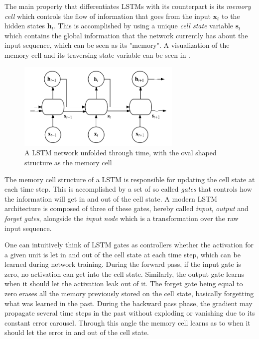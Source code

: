 \documentclass{kththesis}
\begin{document}
The main property that differentiates LSTMs with its counterpart is its \emph{memory cell} which controls the flow of information that goes from the input $\mathbf{x}_t$ to the hidden states $\mathbf{h}_t$. This is accomplished by using a unique \emph{cell state} variable $\mathbf{s}_t$ which contains the global information that the network currently has about the input sequence, which can be seen as its "memory". A visualization of the memory cell and its traversing state variable can be seen in .

\begin{figure}[h]
    \centering
    \includegraphics[width=0.7\textwidth,keepaspectratio]{figures/lstm.pdf}
    \caption{A LSTM network unfolded through time, with the oval shaped structure as the memory cell}
    \label{fig:lstm}
\end{figure}

The memory cell structure of a LSTM is responsible for updating the cell state at each time step. This is accomplished by a set of so called \emph{gates} that controls how the information will get in and out of the cell state. A modern LSTM architecture is composed of three of these gates, hereby called \emph{input}, \emph{output} and \emph{forget gates}, alongside the \emph{input node} which is a transformation over the raw input sequence. 

One can intuitively think of LSTM gates as controllers whether the activation for a given unit is let in and out of the cell state at each time step, which can be learned during network training. During the forward pass, if the input gate is zero, no activation can get into the cell state. Similarly, the output gate learns when it should let the activation leak out of it. The forget gate being equal to zero erases all the memory previously stored on the cell state, basically forgetting what was learned in the past. During the backward pass phase, the gradient may propagate several time steps in the past without exploding or vanishing due to its constant error carousel. Through this angle the memory cell learns as to when it should let the error in and out of the cell state.
\end{document}
